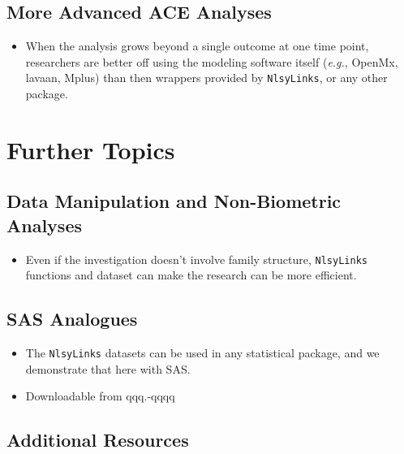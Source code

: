\documentclass[smallextended]{svjour3}       %
\providecommand{\tightlist}{%
  \setlength{\itemsep}{0pt}\setlength{\parskip}{0pt}}
\begin{document}
\hypertarget{more-advanced-ace-analyses}{%
\subsection{More Advanced ACE
Analyses}\label{more-advanced-ace-analyses}}

\begin{itemize}
\tightlist
\item
  When the analysis grows beyond a single outcome at one time point,
  researchers are better off using the modeling software itself
  (\emph{e.g.}, OpenMx, lavaan, Mplus) than then wrappers provided by
  \texttt{NlsyLinks}, or any other package.
\end{itemize}

\hypertarget{further-topics}{%
\section{Further Topics}\label{further-topics}}

\hypertarget{data-manipulation-and-non-biometric-analyses}{%
\subsection{Data Manipulation and Non-Biometric
Analyses}\label{data-manipulation-and-non-biometric-analyses}}

\begin{itemize}
\tightlist
\item
  Even if the investigation doesn't involve family structure,
  \texttt{NlsyLinks} functions and dataset can make the research can be
  more efficient.
\end{itemize}

\hypertarget{sas-analogues}{%
\subsection{SAS Analogues}\label{sas-analogues}}

\begin{itemize}
\tightlist
\item
  The \texttt{NlsyLinks} datasets can be used in any statistical
  package, and we demonstrate that here with SAS.
\item
  Downloadable from qqq.-qqqq
\end{itemize}

\hypertarget{additional-resources}{%
\subsection{Additional Resources}\label{additional-resources}}
\end{document}
